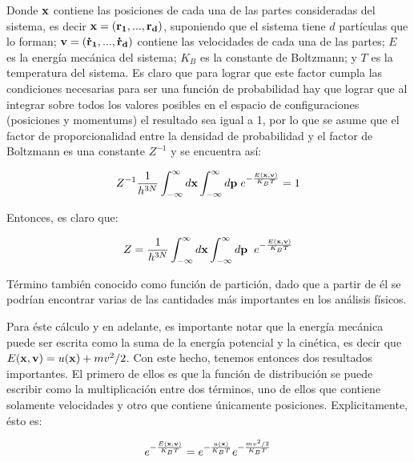 \documentclass [11pt]{article}
\begin{document}
Donde ${\bf x}$ contiene las posiciones de cada una de las partes consideradas del sistema, es decir ${\bf x}=({\bf r_1},...,{\bf r_d}) $, suponiendo que el sistema tiene $d$ partículas que lo forman; ${\bf v}=({\bf \dot{r}_1},...,{\bf \dot{r}_d})$ contiene las velocidades de cada una de las partes; $E$ es la energía mecánica del sistema; $K_B$ es la constante de Boltzmann; y $T$ es la temperatura del sistema. Es claro que para lograr que este factor cumpla las condiciones necesarias para ser una función de probabilidad hay que lograr que al integrar sobre todos los valores posibles en el espacio de configuraciones (posiciones y momentums) el resultado sea igual a 1, por lo que se asume que el factor de proporcionalidad entre la densidad de probabilidad y el factor de Boltzmann es una constante $Z^{-1}$ y se encuentra así:

\begin{equation}
    Z^{-1} \frac{1}{h^{3N}}\int_{-\infty}^{\infty}d{\bf x} \int_{-\infty}^{\infty}d{\bf p}{\hspace{0.1 cm}}e^{-\frac{E({\bf x},{\bf v})}{K_BT}}=1
\end{equation}

Entonces, es claro que:

\begin{equation}
    Z= \frac{1}{h^{3N}}\int_{-\infty}^{\infty}d{\bf x} \int_{-\infty}^{\infty}d{\bf p}{\hspace{0.2 cm}}e^{-\frac{E({\bf x},{\bf v})}{K_BT}}
\end{equation}

Término también conocido como función de partición, dado que a partir de él se podrían encontrar varias de las cantidades más importantes en los análisis físicos. 

Para éste cálculo y en adelante, es importante notar que la energía mecánica puede ser escrita como la suma de la energía potencial y la cinética, es decir que $E({\bf x},{\bf v})= u({\bf x})+m v^2/2$. Con este hecho, tenemos entonces dos resultados importantes. El primero de ellos es que la función de distribución se puede escribir como la multiplicación entre dos términos, uno de ellos que contiene solamente velocidades y otro que contiene únicamente posiciones. Explicitamente, ésto es:

\begin{equation}
    e^{-\frac{E({\bf x},{\bf v})}{K_BT}}=e^{-\frac{u({\bf x})}{K_BT}}e^{-\frac{m v^2/2}{K_BT}}
\end{equation}
\end{document}
